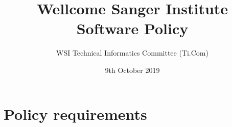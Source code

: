 \documentclass[10pt,a4paper]{article}
\begin{document}
\title{
Wellcome Sanger Institute \\
Software Policy
}
\author{WSI Technical Informatics Committee (Ti.Com)}
\date{9th October 2019}

\maketitle

\newcommand{\exectitle}[0]{Chief Operating Officer}

\newcommand{\execperson}[0]{Martin Dougherty} 

\newcommand{\filename}[1]{\texttt{#1}} 

\newenvironment{boilerplate}[1][]
  {\minipage{\linewidth}%
   \lstset{basicstyle=\ttfamily\footnotesize,breaklines=false,frame=shadowbox,rulesepcolor=\color{blue},#1}}
   {\endminipage}%

\setlength{\parindent}{0pt} %

\setlength{\parskip}{4mm plus2mm minus2mm}

\let\stdsection\section
\renewcommand\section{\newpage\stdsection}




\section{Policy requirements}
\label{section:policy}

\end{document}
